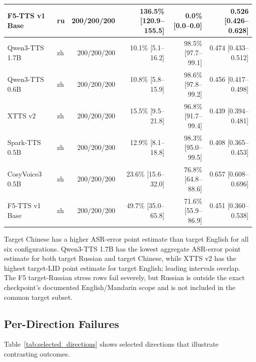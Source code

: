 \documentclass[11pt]{article}
\begin{document}
\begin{table}[t]
{\begin{tabular}{llrrrr}
F5-TTS v1 Base & ru & 200/200/200 & 136.5\% [120.9--155.5] & 0.0\% [0.0--0.0] & 0.526 [0.426--0.628] \\
\midrule
Qwen3-TTS 1.7B & zh & 200/200/200 & 10.1\% [5.1--16.2] & 98.5\% [97.7--99.1] & 0.474 [0.433--0.512] \\
Qwen3-TTS 0.6B & zh & 200/200/200 & 10.8\% [5.8--15.9] & 98.6\% [97.8--99.2] & 0.456 [0.417--0.498] \\
XTTS v2 & zh & 200/200/200 & 15.5\% [9.5--21.8] & 96.8\% [91.7--99.4] & 0.439 [0.394--0.481] \\
Spark-TTS 0.5B & zh & 200/200/200 & 12.9\% [8.1--18.8] & 98.3\% [95.0--99.5] & 0.408 [0.365--0.453] \\
CosyVoice3 0.5B & zh & 200/200/200 & 23.6\% [15.6--32.0] & 76.8\% [64.8--88.6] & 0.657 [0.608--0.696] \\
F5-TTS v1 Base & zh & 200/200/200 & 49.7\% [35.0--65.8] & 71.6\% [55.9--86.9] & 0.451 [0.360--0.538] \\
\bottomrule
\end{tabular}
}
\end{table}

Target Chinese has a higher ASR-error point estimate than target English for all six configurations. Qwen3-TTS 1.7B has the lowest aggregate ASR-error point estimate for both target Russian and target Chinese, while XTTS v2 has the highest target-LID point estimate for target English; leading intervals overlap. The F5 target-Russian stress rows fail severely, but Russian is outside the exact checkpoint's documented English/Mandarin scope and is not included in the common target subset.

\subsection{Per-Direction Failures}

Table~\ref{tab:selected_directions} shows selected directions that illustrate contrasting outcomes.
\end{document}
